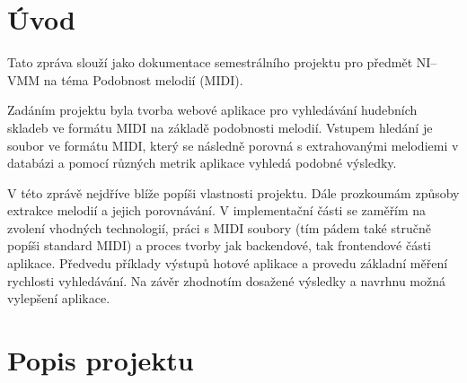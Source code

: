 \section{Úvod}
Tato zpráva slouží jako dokumentace semestrálního projektu pro předmět NI--VMM na téma Podobnost melodií (MIDI).

Zadáním projektu byla tvorba webové aplikace pro vyhledávání hudebních skladeb ve formátu MIDI na základě podobnosti melodií. Vstupem hledání je soubor ve formátu MIDI, který se následně porovná s extrahovanými melodiemi v databázi a pomocí různých metrik aplikace vyhledá podobné výsledky.

V této zprávě nejdříve blíže popíši vlastnosti projektu. Dále prozkoumám způsoby extrakce melodií a jejich porovnávání. V implementační části se zaměřím na zvolení vhodných technologií, práci s MIDI soubory (tím pádem také stručně popíši standard MIDI) a proces tvorby jak backendové, tak frontendové části aplikace. Předvedu příklady výstupů hotové aplikace a provedu základní měření rychlosti vyhledávání. Na závěr zhodnotím dosažené výsledky a navrhnu možná vylepšení aplikace.

\section{Popis projektu}